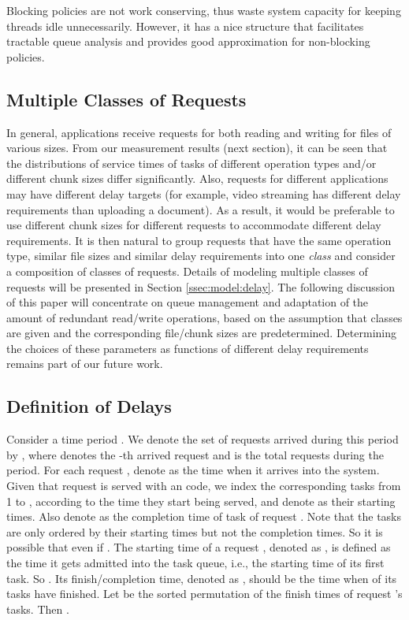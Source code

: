 \documentclass[journal]{IEEEtran}
\begin{document}
Blocking policies are not work conserving, thus waste system capacity for keeping  threads idle unnecessarily. However, it has a nice structure that facilitates tractable queue analysis and provides good approximation for non-blocking policies.



\subsection{Multiple Classes of Requests}

In general, applications receive requests for both reading and writing for files of various sizes. From our measurement results (next section), it can be seen  that the distributions of service times of tasks of different operation types and/or different chunk sizes differ significantly. Also, requests for different applications may have different delay targets (for example, video streaming has different delay requirements than uploading a document). As a result, it would be preferable to use different chunk sizes for different requests to accommodate different delay requirements. It is then natural to group requests that have the same operation type, similar file sizes and similar delay requirements into one {\em class} and consider a composition of  classes of requests. Details of modeling multiple classes of requests will be presented in Section \ref{ssec:model:delay}. The following discussion of this paper will concentrate on queue management and adaptation of the amount of redundant read/write operations, based on the assumption that classes are given and the corresponding file/chunk sizes are predetermined. Determining the choices of these parameters as functions of different delay requirements remains part of our future work. 


\subsection{Definition of Delays}
Consider a time period . We denote the  set of requests arrived during this period by , where   denotes the -th arrived request and  is the total requests during the period. For each request , denote  as the time when it arrives into the system. Given that request  is served with an  code, we index the corresponding  tasks from 1 to , according to the time they start being served, and denote  as their starting times. Also denote  as the completion time of task  of request . Note that the tasks are only ordered by their starting times but not the completion times. So it is possible that  even if . 
The starting time of a request , denoted as , is defined as the time it gets admitted into the task queue, i.e., the starting time of its first task. So . Its finish/completion time, denoted as , should be the time when  of its tasks have finished. Let  be the sorted permutation of the finish times of request 's tasks. Then .
\end{document}
